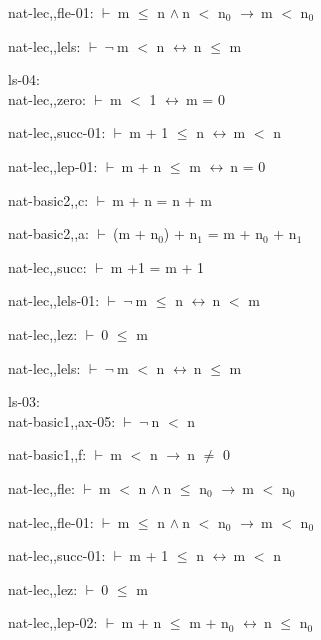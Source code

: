\documentclass[a4paper]{article}
\newcommand{\Fol}{\mbox{$\vdash\ $}}
\newcommand{\Not}{\mbox{$\neg\ $}}
\newcommand{\And}{\mbox{$\wedge\ $}}
\newcommand{\Imp}{\mbox{$\rightarrow\ $}}
\newcommand{\Equiv}{\mbox{$\leftrightarrow\ $}}
\begin{document}
nat-lec,,fle-01: 
 \Fol m $\le$ n \And n $<$ $\mbox{n}_{0}$ \Imp m $<$ $\mbox{n}_{0}$



nat-lec,,lels: 
 \Fol \Not m $<$ n \Equiv n $\le$ m



\bigskip

ls-04:\\ nat-lec,,zero: 
 \Fol m $<$ 1 \Equiv m = 0



nat-lec,,succ-01: 
 \Fol m + 1 $\le$ n \Equiv m $<$ n



nat-lec,,lep-01: 
 \Fol m + n $\le$ m \Equiv n = 0



nat-basic2,,c: 
 \Fol m + n = n + m



nat-basic2,,a: 
 \Fol (m + $\mbox{n}_{0}$) + $\mbox{n}_{1}$ = m + $\mbox{n}_{0}$ + $\mbox{n}_{1}$



nat-lec,,succ: 
 \Fol m +1 = m + 1



nat-lec,,lels-01: 
 \Fol \Not m $\le$ n \Equiv n $<$ m



nat-lec,,lez: 
 \Fol 0 $\le$ m



nat-lec,,lels: 
 \Fol \Not m $<$ n \Equiv n $\le$ m



\bigskip

ls-03:\\ nat-basic1,,ax-05: 
 \Fol \Not n $<$ n



nat-basic1,,f: 
 \Fol m $<$ n \Imp n $\neq$ 0



nat-lec,,fle: 
 \Fol m $<$ n \And n $\le$ $\mbox{n}_{0}$ \Imp m $<$ $\mbox{n}_{0}$



nat-lec,,fle-01: 
 \Fol m $\le$ n \And n $<$ $\mbox{n}_{0}$ \Imp m $<$ $\mbox{n}_{0}$



nat-lec,,succ-01: 
 \Fol m + 1 $\le$ n \Equiv m $<$ n



nat-lec,,lez: 
 \Fol 0 $\le$ m



nat-lec,,lep-02: 
 \Fol m + n $\le$ m + $\mbox{n}_{0}$ \Equiv n $\le$ $\mbox{n}_{0}$
\end{document}
